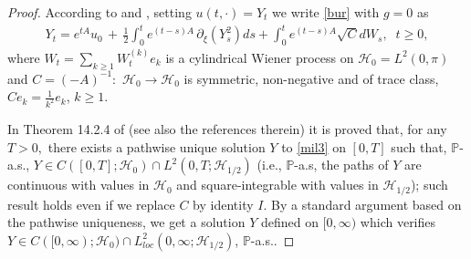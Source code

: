 \documentclass[preprint]{imsart}
\def\P{\mathbb P}
\begin{document}
\begin{proof} 
 According to \cite{ergodicity} and  \cite{burgers}, setting   $u(t, \cdot ) = Y_t$ we write \eqref{bur}  with $g=0$ as 
\begin{equation}\label{mil3}
 \begin{array}{l}
  Y_t = e^{tA} u_0 \, + \, \frac{1}{2}\int_{0}^{t} e^{(  t-s)  A} \, \partial_{\xi}  (
Y_{s}^2)
ds
+\int_{0}^{t}e^{(  t-s)  A} \sqrt{C} dW_{s},\;\; t \ge 0,
\end{array} 
\end{equation}
where $W_t = \sum_{k \ge 1 }  
   W_t^{(k)} e_k $ is a cylindrical Wiener process on ${\mathcal H}_0 = L^2(0,\pi)$ and 
   $C= (-A)^{-1}: $ ${\mathcal H}_0 \to {\mathcal H}_0 $ is  symmetric, non-negative
and of trace class,
 $C e_k = \frac{1}{k^2} e_k$, $k \ge 1$.  
  
 \vskip 1mm 
 In Theorem 14.2.4 of \cite{ergodicity} (see also the references therein) it is proved that, for any $T>0,$ there exists a pathwise unique solution $Y$ to \eqref{mil3} on $[0,T]$ such that, $\P$-a.s., $Y \in C([0,T]; {\mathcal H}_0) \cap 
L^2(0,T; {\mathcal H}_{1/2})$ (i.e., $\P$-a.s, the paths of $Y$ are continuous  with values in ${\mathcal H}_0$ and square-integrable with values in ${\mathcal H}_{1/2}$); 
such  result  holds even  if we replace $C $ by identity $I$. 
 By a standard argument based on the pathwise uniqueness, we get a solution $Y$ defined on $[0, \infty)$ which verifies  $Y \in C([0,\infty); {\mathcal H}_0) \cap 
L^2_{loc}(0, \infty; {\mathcal H}_{1/2})$, $\P$-a.s.. 


\end{proof}
\end{document}
